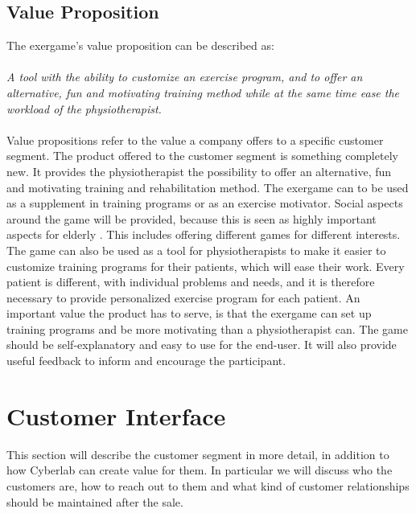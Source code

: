 \subsection{Value Proposition}
The exergame's value proposition can be described as: \\ \\
\emph{A tool with the ability to customize an exercise program, and to offer an alternative, fun and motivating training method while at the same time ease the workload of the physiotherapist.}\\ \\
Value propositions refer to the value a company offers to a specific customer segment. The product offered to the customer segment is something completely new. It provides the physiotherapist the possibility to offer an alternative, fun and motivating training and rehabilitation method. The exergame can to be used as a supplement in training programs or as an exercise motivator. Social aspects around the game will be provided, because this is seen as highly important aspects for elderly \cite{exergamesforelderly}. This includes offering different games for different interests. The game can also be used as a tool for physiotherapists to make it easier to customize training programs for their patients, which will ease their work. Every patient is different, with individual problems and needs, and it is therefore necessary to provide personalized exercise program for each patient. An important value the product has to serve, is that the exergame can set up training programs and be more motivating than a physiotherapist can. The game should be self-explanatory and easy to use for the end-user. It will also provide useful feedback to inform and encourage the participant.
\section{Customer Interface}
This section will describe the customer segment in more detail, in addition to how Cyberlab can create value for them. In particular we will discuss who the customers are, how to reach out to them and what kind of customer relationships should be maintained after the sale. 
